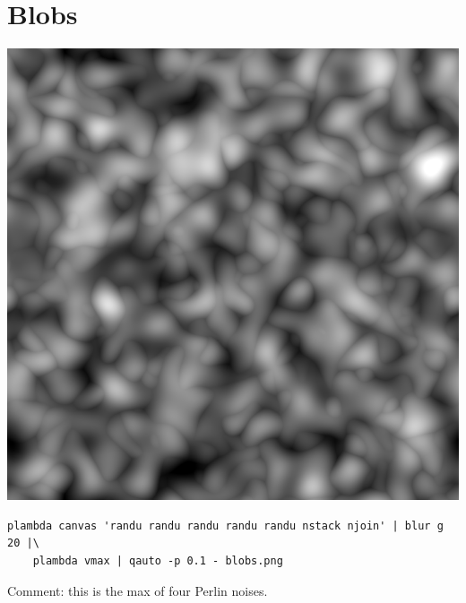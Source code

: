 \section{Blobs}
\includegraphics{blobs.png}
\begin{verbatim}
plambda canvas 'randu randu randu randu randu nstack njoin' | blur g 20 |\
	plambda vmax | qauto -p 0.1 - blobs.png
\end{verbatim}
Comment: this is the max of four Perlin noises.



